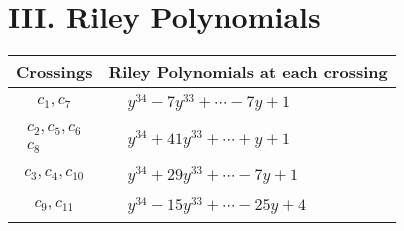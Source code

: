 \documentclass[1p]{elsarticle_modified}
\theoremstyle{definition}
\begin{document}
\centering \section*{ III. Riley Polynomials}
\begin{tabular}{m{50pt}|m{274pt}}
Crossings & \hspace{64pt}Riley Polynomials at each crossing \\
\hline $$\begin{aligned}c_{1},c_{7}\end{aligned}$$&$\begin{aligned}
&y^{34}-7 y^{33}+\cdots-7 y+1
\end{aligned}$\\
\hline $$\begin{aligned}c_{2},c_{5},c_{6}\\c_{8}\end{aligned}$$&$\begin{aligned}
&y^{34}+41 y^{33}+\cdots+y+1
\end{aligned}$\\
\hline $$\begin{aligned}c_{3},c_{4},c_{10}\end{aligned}$$&$\begin{aligned}
&y^{34}+29 y^{33}+\cdots-7 y+1
\end{aligned}$\\
\hline $$\begin{aligned}c_{9},c_{11}\end{aligned}$$&$\begin{aligned}
&y^{34}-15 y^{33}+\cdots-25 y+4
\end{aligned}$\\
\hline
\end{tabular}
\vskip 2pc
\end{document}
